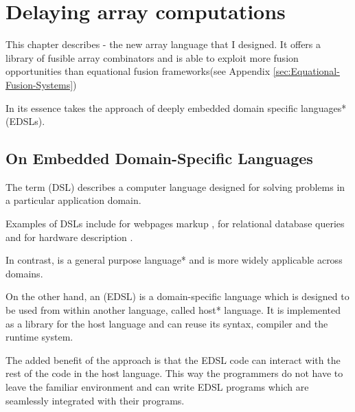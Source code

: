 \documentclass[preamble.tex]{subfiles}
\begin{document}
\clearpage

\chapter{Delaying array computations}
\label{ch:frontend}

This chapter describes \LiveFusion - the new array language that I designed. It offers a library of fusible array combinators and is able to exploit more fusion opportunities than equational fusion frameworks\ieqf (see Appendix \ref{sec:Equational-Fusion-Systems})

In its essence \LiveFusion takes the approach of \*deeply embedded domain specific languages* (EDSLs).\iedsl


\section{On Embedded Domain-Specific Languages}
\iedsl

The term  (DSL) describes a computer language designed for solving problems in a particular application domain.

Examples of DSLs include  for webpages markup \cite{HTML},  for relational database queries \cite{SQL} and  for hardware description \cite{Verilog}.

In contrast, \Haskell \cite{Pey03} is a \*general purpose language* and is more widely applicable across domains.

On the other hand, an  (EDSL) is a domain-specific language which is designed to be used from within another language, called \*host* language. It is implemented as a library for the host language and can reuse its syntax, compiler and the runtime system.

The added benefit of the approach is that the EDSL code can interact with the rest of the code in the host language. This way the programmers do not have to leave the familiar environment and can write EDSL programs which are seamlessly integrated with their programs.
\end{document}
